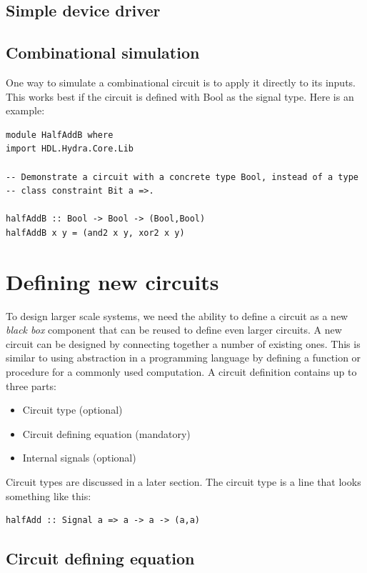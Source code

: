 \documentclass[]{svmono}
\begin{document}
\subsection*{Simple device driver}
\label{sec:org305fc26}
\subsection*{Combinational simulation}
\label{sec:orga608fe1}

One way to simulate a combinational circuit is to apply it directly to
its inputs.  This works best if the circuit is defined with Bool as
the signal type.   Here is an example:

\begin{verbatim}
module HalfAddB where
import HDL.Hydra.Core.Lib

-- Demonstrate a circuit with a concrete type Bool, instead of a type
-- class constraint Bit a =>.

halfAddB :: Bool -> Bool -> (Bool,Bool)
halfAddB x y = (and2 x y, xor2 x y)
\end{verbatim}
\section*{Defining new circuits}
\label{sec:org5a7e704}

To design larger scale systems, we need the ability to define a
circuit as a new \emph{black box} component that can be reused to define
even larger circuits.  A new circuit can be designed by connecting
together a number of existing ones.  This is similar to using
abstraction in a programming language by defining a function or
procedure for a commonly used computation.  A circuit definition
contains up to three parts:

\begin{itemize}
\item Circuit type (optional)
\item Circuit defining equation (mandatory)
\item Internal signals (optional)
\end{itemize}

Circuit types are discussed in a later section.  The circuit type is a
line that looks something like this:

\begin{verbatim}
halfAdd :: Signal a => a -> a -> (a,a)
\end{verbatim}
\subsection*{Circuit defining equation}
\label{sec:org88fe92d}
\end{document}

